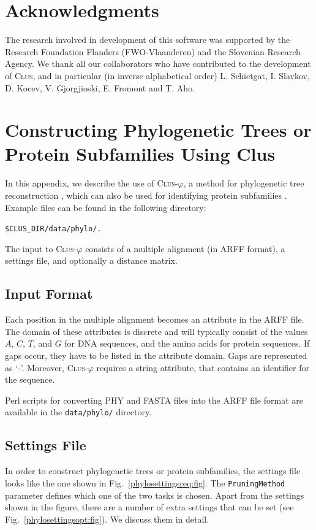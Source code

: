 \documentclass[a4paper]{report}
\newcommand{\clus}{\textsc{Clus}}
\newcommand{\clusphy}{\textsc{Clus}-$\varphi$}
\begin{document}
\chapter*{Acknowledgments}
The research involved in development of this software was supported by the Research Foundation Flanders (FWO-Vlaanderen) and the Slovenian Research Agency. We thank all our collaborators who have contributed to the development of \clus{}, and in particular (in inverse alphabetical order) L. Schietgat, I. Slavkov, D. Kocev, V. Gjorgjioski, E. Fromont and T. Aho.

\appendix
\chapter{Constructing Phylogenetic Trees or Protein Subfamilies Using Clus}

In this appendix, we describe the use of \clusphy{}, a method for phylogenetic tree reconstruction \cite{Vens10:proc}, which can also be used for identifying protein subfamilies \cite{Costa2012}.
Example files can be found in the following directory:  
\begin{flushleft}
\verb^$CLUS_DIR/data/phylo/.^
\end{flushleft}

The input to \clusphy{} consists of a multiple alignment (in ARFF format), a settings file, and optionally a distance matrix.

\section{Input Format}
Each position in the multiple alignment becomes an attribute in the ARFF file. The domain of these attributes is discrete and will typically consist of the values $A$, $C$, $T$, and $G$ for DNA sequences, and the amino acids for protein sequences. If gaps occur, they have to be listed in the attribute domain. Gaps are represented as `-'.
Moreover, \clusphy{} requires a string attribute, that contains an identifier for the sequence.

Perl scripts for converting PHY and FASTA files into the ARFF file format are available in the {\tt data/phylo/} directory.

\section{Settings File}
In order to construct phylogenetic trees or protein subfamilies, the settings file looks like the one shown in Fig.~\ref{phylosettingsreq:fig}. The {\tt PruningMethod} parameter defines which one of the two tasks is chosen. Apart from the settings shown in the figure, there are a number of extra settings that can be set (see Fig.~\ref{phylosettingsopt:fig}). We discuss them in detail.
\end{document}
